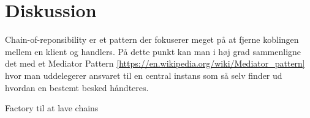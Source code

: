\chapter{Diskussion}
Chain-of-reponsibility er et pattern der fokuserer meget på at fjerne koblingen mellem en klient og handlers. På dette punkt kan man i høj grad sammenligne det med et Mediator Pattern \ref{https://en.wikipedia.org/wiki/Mediator_pattern} hvor man uddelegerer ansvaret til en central instans som så selv finder ud hvordan en bestemt besked håndteres.


Factory til at lave chains